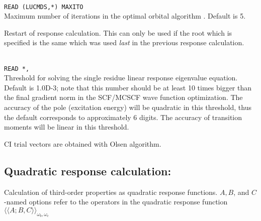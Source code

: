 \begin{description}
\item{}\\
\verb|READ (LUCMDS,*) MAXITO|\\
Maximum number of iterations in the optimal orbital
algorithm
\cite{tuhjahjajpjjcp84}. 
Default is 5.

\item{}
Restart of response
calculation. This can only be used if the root which is 
specified is the same which was used \textit{last} in the previous
response calculation.

\item{}\\
\verb|READ *,|\\
Threshold for solving the single residue linear response eigenvalue equation. 
Default is 1.0D-3; note that this number should be at least 10 times
bigger than the final gradient norm in the SCF/MCSCF
wave function optimization.
The accuracy of the pole (excitation energy) will be 
quadratic in this threshold, thus the default corresponds to approximately
6 digits. The accuracy of transition moments will be linear in this threshold.

\item{}
CI trial vectors are obtained with Olsen algorithm.

\end{description}

\subsection{Quadratic response calculation: }

Calculation of third-order properties as quadratic response
functions.
$A,B$, and $C$-named options refer to the operators in the quadratic
response function 
$\langle\!\langle A;B,C \rangle\!\rangle_{\omega_b,\omega_c}$
\cite{ovhapjhjajthjojcp97,hhhjajpjjojcp97,haovhkpjthjcp98}

